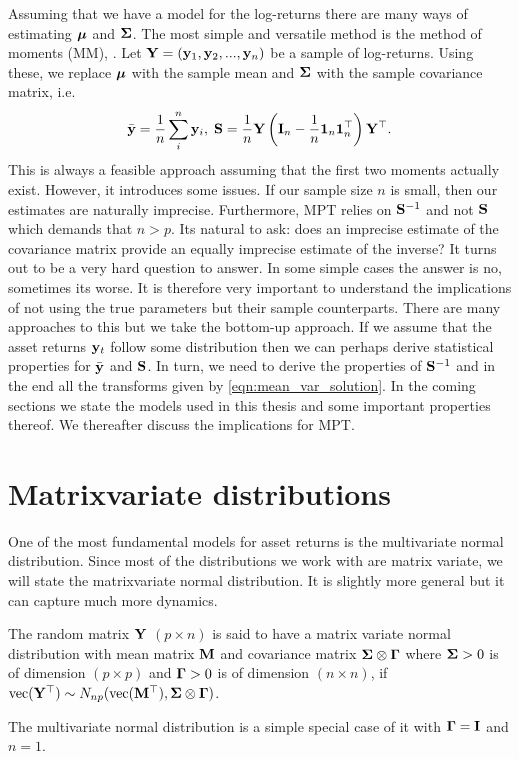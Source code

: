 \documentclass[oneside]{book}\usepackage{knitr}
\begin{document}
Assuming that we have a model for the log-returns there are many ways of estimating $\mbox{\boldmath$\mu$}$ and $\mathbf{\Sigma}$.
The most simple and versatile method is the method of moments (MM), \cite[ch. 9]{wasserman2004all}. 
Let $\mathbf{Y} = (\mathbf{y}_1, \mathbf{y}_2, ..., \mathbf{y}_n)$ be a sample of log-returns.
Using these, we replace $\mbox{\boldmath$\mu$}$ with the sample mean and $\mathbf{\Sigma}$ with the sample covariance matrix, i.e.
$$
\bar{\mathbf{y}} = \frac{1}{n} \sum_i^n \mathbf{y}_i, \; \mathbf{S} = \frac{1}{n}\mathbf{Y} \left(\mathbf{I}_n - \frac{1}{n} \mathbf{1}_n \mathbf{1}_n^\top \right) \mathbf{Y}^\top.
$$
This is always a feasible approach assuming that the first two moments actually exist. 
However, it introduces some issues.
If our sample size $n$ is small, then our estimates are naturally imprecise. 
Furthermore, MPT relies on $\mathbf{S}^{-1}$ and not $\mathbf{S}$ which demands that $n>p$. 
Its natural to ask: does an imprecise estimate of the covariance matrix provide an equally imprecise estimate of the inverse?
It turns out to be a very hard question to answer. 
In some simple cases the answer is no, sometimes its worse. 
It is therefore very important to understand the implications of not using the true parameters but their sample counterparts.
There are many approaches to this but we take the bottom-up approach. 
If we assume that the asset returns $\mathbf{y}_t$ follow some distribution then we can perhaps derive statistical properties for $\bar{\mathbf{y}}$ and $\mathbf{S}$.
In turn, we need to derive the properties of $\mathbf{S}^{-1}$ and in the end all the transforms given by \eqref{eqn:mean_var_solution}.
In the coming sections we state the models used in this thesis and some important properties thereof.
We thereafter discuss the implications for MPT.

\section{Matrixvariate distributions}
One of the most fundamental models for asset returns is the multivariate normal distribution. 
Since most of the distributions we work with are matrix variate, we will state the matrixvariate normal distribution. 
It is slightly more general but it can capture much more dynamics.
\begin{definition}\label{def:matrixnormal}
	The random matrix $\mathbf{Y}$ $(p \times n)$ is said to have a matrix variate normal distribution with mean matrix $\mathbf{M}$ and covariance matrix $\mathbf{\Sigma} \otimes \boldsymbol{\Gamma}$ where $\mathbf{\Sigma} > 0$ is of dimension $(p \times p)$ and $\boldsymbol{\Gamma} >0$ is of dimension $(n \times n)$, if $\operatorname{vec}(\mathbf{Y}^\top) \sim N_{np}(\operatorname{vec}(\mathbf{M}^\top), \mathbf{\Sigma} \otimes \boldsymbol{\Gamma})$.
\end{definition}
The multivariate normal distribution is a simple special case of it with $\boldsymbol{\Gamma} = \mathbf{I}$ and $n=1$.
\end{document}
